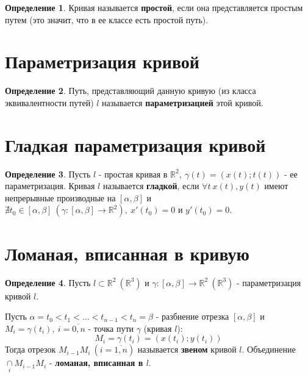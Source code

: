 \documentclass{report}
\theoremstyle{definition}
\newtheorem*{definition}{Определение}
\begin{document}
\begin{definition}
    Кривая называется \textbf{простой}, если она представляется простым путем (это значит, что в ее классе
    есть простой путь).
\end{definition}

\section{Параметризация кривой}

\begin{definition}
    Путь, представляющий данную кривую (из класса эквивалентности путей) $l$ называется
    \textbf{параметризацией} этой кривой.
\end{definition}

\section{Гладкая параметризация кривой}

\begin{definition}
    Пусть $l$ - простая кривая в $\mathbb{R}^2, \ \gamma(t) = (x(t);t(t))$ - ее параметризация.
    Кривая $l$ называется \textbf{гладкой}, если $\forall t \ x(t),y(t)$ имеют непрерывные производные
    на $[\alpha,\beta]$ и $\nexists t_0 \in [\alpha,\beta] \ (\gamma : [\alpha,\beta] \rightarrow
        \mathbb{R}^2), \ x'(t_0)=0$ и $y'(t_0) = 0$.
\end{definition}

\section{Ломаная, вписанная в кривую}

\begin{definition}
    Пусть $l \subset \mathbb{R}^2 \ (\mathbb{R}^3)$ и $\gamma:[\alpha,\beta]\rightarrow\mathbb{R}^2 \
        (\mathbb{R}^3)$ - параметризация кривой $l$.

    Пусть $\alpha = t_0 < t_1 < \ldots < t_{n-1} < t_n = \beta$ - разбиение отрезка $[\alpha,\beta]$
    и $M_i = \gamma(t_i), \ i=\overline{0,n}$ - точка пути $\gamma$ (кривая $l$):
    \begin{equation*}
        M_i = \gamma (t_i) = (x(t_i);y(t_i))
    \end{equation*}
    Тогда отрезок $M_{i-1}M_i \ (i = \overline{1,n})$ называется \textbf{звеном} кривой $l$.
    Объединение $\underset{i}{\cap}M_{i-1}M_i$ - \textbf{ломаная, вписанная в $l$}.
\end{definition}
\end{document}

